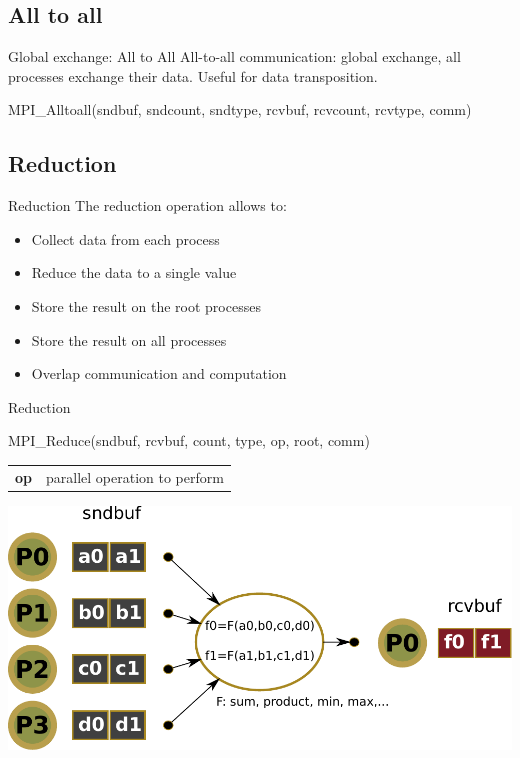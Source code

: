 \documentclass[aspectratio=43]{beamer}
\begin{document}
\subsection{All to all}
\begin{frame}[fragile]{Global exchange: All to All}
All-to-all communication: global exchange, all processes exchange their data. Useful for data transposition.\\
\begin{Pseudolisting}[]{}
MPI_Alltoall(sndbuf, sndcount, sndtype,
             rcvbuf, rcvcount, rcvtype, comm)
\end{Pseudolisting}
\end{frame}


\subsection{Reduction}
\begin{frame}{Reduction}
The reduction operation allows to:
\begin{itemize}
\item Collect data from each process
\item Reduce the data to a single value
\item Store the result on the root processes
\item Store the result on all processes
\item Overlap communication and computation
\end{itemize}
\end{frame}

\begin{frame}[fragile]{Reduction}
\begin{Pseudolisting}[]{}
MPI_Reduce(sndbuf, rcvbuf, count, type, op, root, comm)
\end{Pseudolisting}
\begin{black1block}{}
\begin{tabular}{rp{8cm}}
\textbf{op} & parallel operation to perform\\
\end{tabular}
\end{black1block}
\begin{center}
\includegraphics[scale=0.5]{03.MPI_Coll/reduce.pdf}
\end{center}
\end{frame}
\end{document}
